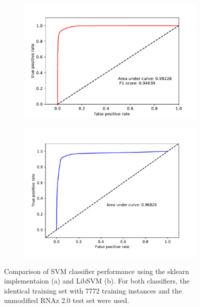 \documentclass[]{article}
\begin{document}
\begin{figure}[H]
	\centering
	\begin{subfigure}[b]{0.45\textwidth}
		\includegraphics[width=1\textwidth]{example_sklearn.pdf}
		\caption{}
		\label{fig1}
	\end{subfigure}
	\hfill
	\begin{subfigure}[b]{0.42\textwidth}
		\includegraphics[width=1\textwidth]{libsvm_example.pdf}
		\caption{}
		\label{fig1}
	\end{subfigure}
	\caption{Comparison of SVM classifier performance using the sklearn implementaion (a) and LibSVM (b). For both classifiers, the identical training set with 7772 training instances and the unmodified RNAz 2.0 test set were used. }
\end{figure}
\end{document}

